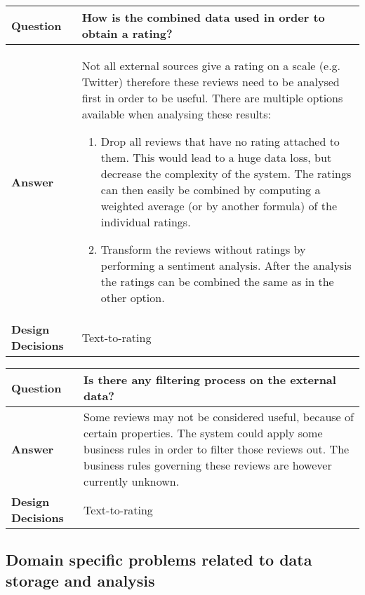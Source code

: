 \begin{longtable}{| l |  p{12cm} |}
\hline
\textbf{Question} & \textbf{How is the combined data used in order to obtain a rating?} \\ \hline
\textbf{Answer} &
	Not all external sources give a rating on a scale (e.g. Twitter) therefore these reviews need to be analysed first in order to be useful. There are multiple options available when analysing these results:
	\begin{enumerate}
	\item Drop all reviews that have no rating attached to them. This would lead to a huge data loss, but decrease the complexity 			of the system. The ratings can then easily be combined by computing a weighted average (or by another formula) of the individual ratings.	
	\item Transform the reviews without ratings by performing a sentiment analysis. After the analysis the ratings can be combined the same as in the other option.
\end{enumerate} \\ \hline
\textbf{Design Decisions} & Text-to-rating \\ \hline
\end{longtable}

\begin{longtable}{| l |  p{12cm} |}
\hline
\textbf{Question} & \textbf{Is there any filtering process on the external data?} \\ \hline
\textbf{Answer} &
	Some reviews may not be considered useful, because of certain properties. The system could apply some business rules in order to filter those reviews out. The business rules governing these reviews are however currently unknown. \\ \hline
\textbf{Design Decisions} & Text-to-rating \\ \hline
\end{longtable}


\subsection{Domain specific problems related to data storage and analysis}
